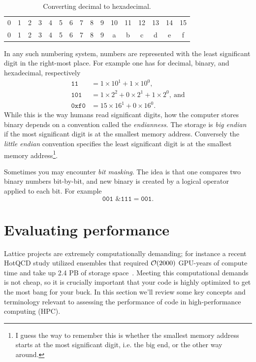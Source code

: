 \begin{table}
\centering
\caption{Converting decimal to hexadecimal.}
\begin{tabularx}{\linewidth}{CCCCCCCCCCCCCCCC}
\hline{} & 1 & 2 & 3 & 4 & 5 & 6 & 7 & 8 & 9 & 10 & 11 & 12 & 13 & 14 & 15\\
0 & 1 & 2 & 3 & 4 & 5 & 6 & 7 & 8 & 9 & a & b & c & d & e & f\\
\hline\hline
\end{tabularx}
\label{tab:hexadecimal}
\end{table}

In any such numbering system, numbers are represented with the least significant
digit in the right-most place. For example one has for decimal, binary, and
hexadecimal, respectively
\begin{equation*}\begin{aligned}
  \texttt{11} &= 1\times10^1+1\times10^0, \\
  \texttt{101} &= 1\times2^2+0\times2^1+1\times2^0,~\text{and} \\
  \texttt{0xf0} &= 15\times16^1+0\times16^0.
\end{aligned}\end{equation*}
While this is the way humans read significant digits, how the computer stores
binary depends on a convention called the {\it endianness}.
The storage is {\it big endian}  if the most significant digit 
is at the smallest memory address. Conversely the
{\it little endian}  convention specifies the least
significant digit is at the smallest memory address\footnote{I guess the way
to remember this is whether the smallest memory address starts at the most
significant digit, i.e. the big end, or the other way around.}.

Sometimes you may encounter {\it bit masking}. The idea is that one compares
two binary numbers bit-by-bit, and new binary is created by a logical operator
applied to each bit. For example
\begin{equation*}
  \texttt{001 \& 111} = \texttt{001}. 
\end{equation*}


\section{Evaluating performance}

Lattice projects are extremely computationally demanding; for instance
a recent HotQCD study utilized ensembles that required
$\order{2000}$ GPU-years of compute time and take up 2.4 PB of storage 
space~\cite{Bollweg:2021vqf}. Meeting this computational demands is
not cheap, so it is crucially important that your code is highly
optimized to get the most bang for your buck.
In this section we'll review some key concepts and terminology
relevant to assessing the performance of code
in high-performance computing (HPC). 

